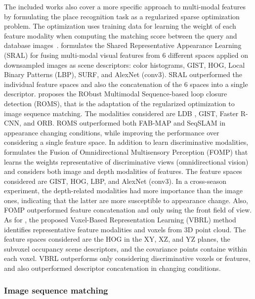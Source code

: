 The included works also cover a more specific approach to multi-modal features by formulating the place recognition task as a regularized sparse optimization problem. The optimization uses training data for learning the weight of each feature modality when computing the matching score between the query and database images~\parencite{han-et-al:2017:2662061,han-et-al:2018:3,siva-zhang:2018:8461042,siva-et-al:2020:9340992}.
\cite{han-et-al:2017:2662061} formulates the Shared Representative Appearance Learning (SRAL) for fusing multi-modal visual features from 6 different spaces applied on downsampled images as scene descriptors: color histograms, GIST, HOG, Local Binary Patterns (LBP), SURF, and AlexNet (conv3). SRAL outperformed the individual feature spaces and also the concatenation of the 6 spaces into a single descriptor.
\cite{han-et-al:2018:3} proposes the RObust Multimodal Sequence-based loop closure detection (ROMS), that is the adaptation of the regularized optimization to image sequence matching. The modalities considered are LDB \parencite{arroyo-et-al:2018:7}, GIST, Faster R-CNN, and ORB. ROMS outperformed both FAB-MAP and SeqSLAM in appearance changing conditions, while improving the performance over considering a single feature space.
In addition to learn discriminative modalities, \cite{siva-zhang:2018:8461042} formulates the Fusion of Omnidirectional Multisensory Perception (FOMP) that learns the weights representative of discriminative views (omnidirectional vision) and considers both image and depth modalities of features. The feature spaces considered are GIST, HOG, LBP, and AlexNet (conv3). In a cross-season experiment, the depth-related modalities had more importance than the image ones, indicating that the latter are more susceptible to appearance change. Also, FOMP outperformed feature concatenation and only using the front field of view.
As for \cite{siva-et-al:2020:9340992}, the proposed Voxel-Based Representation Learning (VBRL) method identifies representative feature modalities and voxels from 3D point cloud. The feature spaces considered are the HOG in the XY, XZ, and YZ planes, the subvoxel occupancy scene descriptors, and the covariance points containe within each voxel. VBRL outperforms only considering discriminative voxels or features, and also outperformed descriptor concatenation in changing conditions.



\subsubsection{Image sequence matching}

